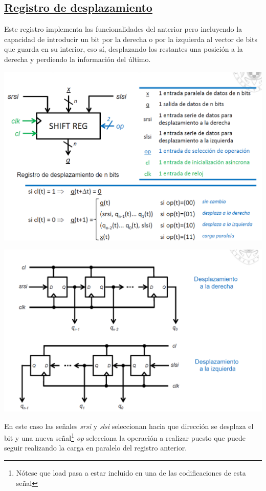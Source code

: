 \documentclass[a4paper,10pt]{book}
\begin{document}
\subsection*{\underline{Registro de desplazamiento}}
Este registro implementa las funcionalidades del anterior pero incluyendo la capacidad de introducir un bit por la derecha o por la izquierda al vector de bits que guarda en su interior, eso sí, desplazando los restantes una posición a la derecha y perdiendo la información del último.
\begin{center}
\includegraphics[scale=0.45]{registro de desplazamiento}
\end{center}
\begin{center}
\includegraphics[scale=0.45]{desplazamiento bilateral}
\end{center}

En este caso las señales \textit{srsi} y \textit{slsi} seleccionan hacia que dirección se desplaza el bit y una nueva señal\footnote{Nótese que load pasa a estar incluido en una de las codificaciones de esta señal} \textit{op} selecciona la operación a realizar puesto que puede seguir realizando la carga en paralelo del registro anterior.
\end{document}
